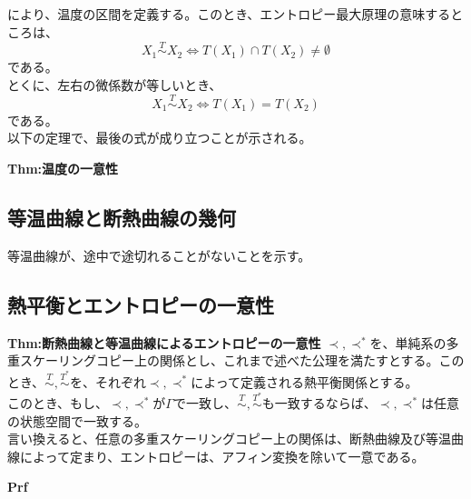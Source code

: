 \documentclass[a4paper,11pt]{jsarticle}
\numberwithin{equation}{section}
\begin{document}
により、温度の区間を定義する。このとき、エントロピー最大原理の意味するところは、
\begin{equation}
    X_1 \overset{T}{\sim} X_2 \Leftrightarrow T(X_1)\cap T(X_2) \neq \emptyset
\end{equation}
である。\\
とくに、左右の微係数が等しいとき、
\begin{equation}
    X_1 \overset{T}{\sim} X_2 \Leftrightarrow T(X_1)=T(X_2)
\end{equation}
である。\\
以下の定理で、最後の式が成り立つことが示される。\\

\begin{itembox}[l]{\textbf{Thm:温度の一意性}}

\end{itembox}
\subsection{等温曲線と断熱曲線の幾何}
等温曲線が、途中で途切れることがないことを示す。\\  

\subsection{熱平衡とエントロピーの一意性}
\begin{itembox}[l]{\textbf{Thm:断熱曲線と等温曲線によるエントロピーの一意性}}
    $\prec,\prec^{*}$を、単純系の多重スケーリングコピー上の関係とし、これまで述べた公理を満たすとする。このとき、$\overset{T}{\sim},\overset{T^{*}}{\sim}$を、それぞれ$\prec,\prec^{*}$によって定義される熱平衡関係とする。\\
    このとき、もし、$\prec,\prec^{*}$が$\Gamma$で一致し、$\overset{T}{\sim},\overset{T^{*}}{\sim}$も一致するならば、$\prec,\prec^{*}$は任意の状態空間で一致する。\\
    言い換えると、任意の多重スケーリングコピー上の関係は、断熱曲線及び等温曲線によって定まり、エントロピーは、アフィン変換を除いて一意である。
\end{itembox}
\textbf{Prf}\\
\end{document}
